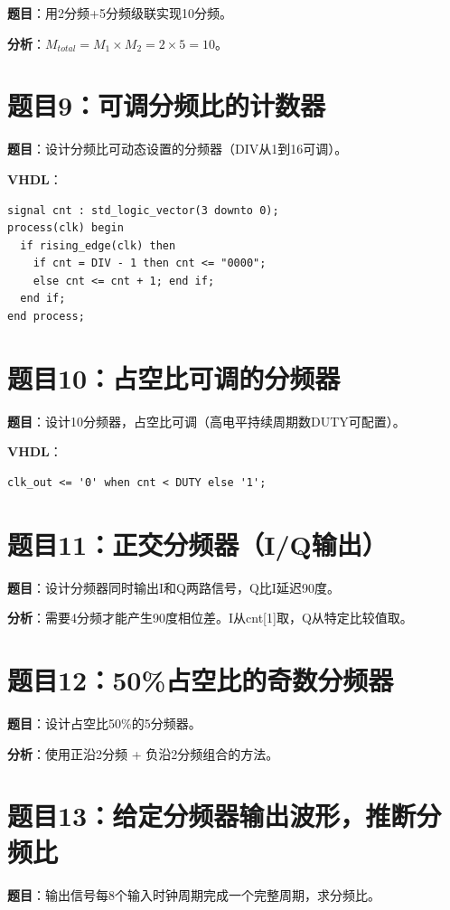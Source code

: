 \textbf{题目}：用2分频+5分频级联实现10分频。

\textbf{分析}：$M_{total} = M_1 \times M_2 = 2 \times 5 = 10$。

\section*{题目9：可调分频比的计数器}

\textbf{题目}：设计分频比可动态设置的分频器（DIV从1到16可调）。

\textbf{VHDL}：
\begin{lstlisting}
signal cnt : std_logic_vector(3 downto 0);
process(clk) begin
  if rising_edge(clk) then
    if cnt = DIV - 1 then cnt <= "0000";
    else cnt <= cnt + 1; end if;
  end if;
end process;
\end{lstlisting}

\section*{题目10：占空比可调的分频器}

\textbf{题目}：设计10分频器，占空比可调（高电平持续周期数DUTY可配置）。

\textbf{VHDL}：
\begin{lstlisting}
clk_out <= '0' when cnt < DUTY else '1';
\end{lstlisting}

\section*{题目11：正交分频器（I/Q输出）}

\textbf{题目}：设计分频器同时输出I和Q两路信号，Q比I延迟90度。

\textbf{分析}：需要4分频才能产生90度相位差。I从cnt[1]取，Q从特定比较值取。

\section*{题目12：50\%占空比的奇数分频器}

\textbf{题目}：设计占空比50\%的5分频器。

\textbf{分析}：使用正沿2分频 + 负沿2分频组合的方法。

\section*{题目13：给定分频器输出波形，推断分频比}

\textbf{题目}：输出信号每8个输入时钟周期完成一个完整周期，求分频比。

